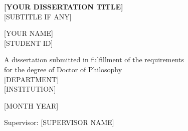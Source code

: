 \begin{titlepage}
\centering
\vspace*{2cm}


{\LARGE\bfseries [YOUR DISSERTATION TITLE]\\[0.5cm]}
{\Large [SUBTITLE IF ANY]\\[2cm]}

{\large [YOUR NAME]\\[0.5cm]}
{\normalsize [STUDENT ID]\\[2cm]}

A dissertation submitted in fulfillment of the requirements\\
for the degree of Doctor of Philosophy\\[1cm]

{\normalsize [DEPARTMENT]\\[0.2cm]}
{\normalsize [INSTITUTION]\\[2cm]}

{\normalsize [MONTH YEAR]}

\vfill
{\small Supervisor: [SUPERVISOR NAME]}
\end{titlepage}

